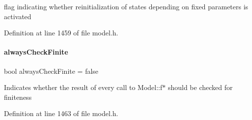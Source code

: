 flag indicating whether reinitialization of states depending on fixed parameters is activated 

Definition at line 1459 of file model.\+h.

\mbox{\label{classamici_1_1_model_a3ebc8e0e8303452473cee7bbc8eeceb9}} 
\paragraph{\texorpdfstring{alwaysCheckFinite}{alwaysCheckFinite}}
{\footnotesize\ttfamily bool always\+Check\+Finite = false\hspace{0.3cm}{\ttfamily [protected]}}

Indicates whether the result of every call to Model\+::f$\ast$ should be checked for finiteness 

Definition at line 1463 of file model.\+h.

